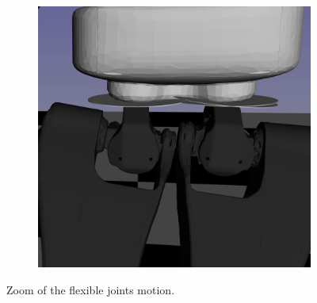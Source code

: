 \begin{figure}[t]
\begin{subfigure}[b]{0.32\textwidth}
    \end{subfigure}
    \hfill
     \begin{subfigure}[b]{0.32\textwidth}
        \centering
        \includegraphics[width=\columnwidth]{chapter_flexible_joints/figures/zoom_flex_3.png}
    \end{subfigure}
    \caption{Zoom of the flexible joints motion\label{fig:talos_flex_walking_zoom}.}
\end{figure}
